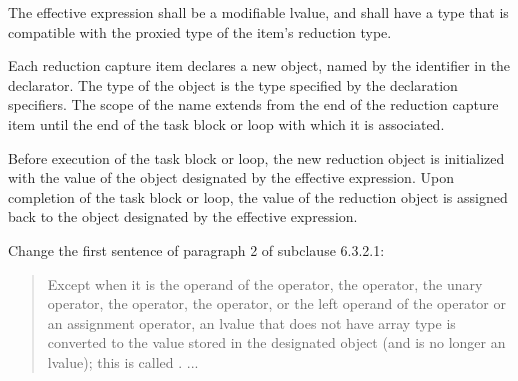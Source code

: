 \pnum
The effective expression shall be a modifiable lvalue,
and shall have a type that is compatible with the proxied type
of the item's reduction type.


\pnum
Each reduction capture item declares a new object,
named by the identifier in the declarator.
The type of the object is the type specified by the declaration specifiers.
The scope of the name extends from the end of the reduction capture item
until the end of the task block or loop with which it is associated.

\pnum
Before execution of the task block or loop,
the new reduction object is initialized
with the value of the object designated by the effective expression.
Upon completion of the task block or loop,
the value of the reduction object is assigned back
to the object designated by the effective expression.

\pnum
Change the first sentence of paragraph 2 of subclause 6.3.2.1:

\begin{quote}
Except when it
is the operand of the  operator,
the  operator, the
unary \tcode{\&} operator,
the \tcode{++} operator,
the \tcode{--} operator,
or the left operand of the  operator
or an assignment operator,
an lvalue that does not have array type
is converted to the value stored in the designated object
(and is no longer an lvalue);
this is called
. ...
\end{quote}

